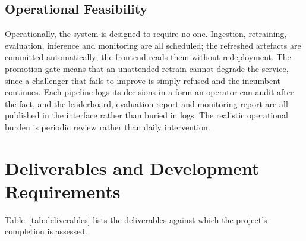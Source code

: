 \subsection{Operational Feasibility}
Operationally, the system is designed to require no one. Ingestion, retraining,
evaluation, inference and monitoring are all scheduled; the refreshed artefacts
are committed automatically; the frontend reads them without redeployment. The
promotion gate means that an unattended retrain cannot degrade the service, since
a challenger that fails to improve is simply refused and the incumbent continues.
Each pipeline logs its decisions in a form an operator can audit after the fact,
and the leaderboard, evaluation report and monitoring report are all published in
the interface rather than buried in logs. The realistic operational burden is
periodic review rather than daily intervention.

\section{Deliverables and Development Requirements}
Table~\ref{tab:deliverables} lists the deliverables against which the project's
completion is assessed.

